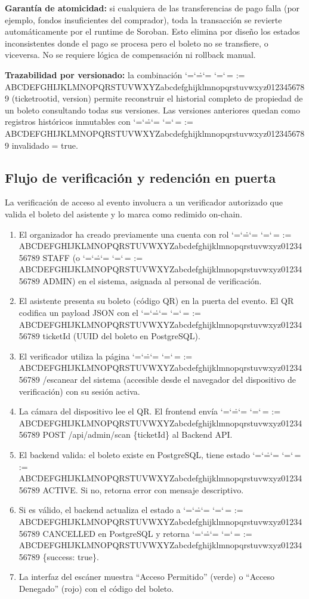 \documentclass[12pt,oneside]{article}
\makeatletter
\def\ttbreak@uscore{\char95\penalty0\hskip0pt\relax}%
\def\ttbreak@actcat#1{\catcode`#1=\active}%
\def\ttbreak@chars{%
  \catcode`\/=\active \catcode`\.=\active \catcode`\:=\active
  \catcode`\-=\active \catcode`\,=\active
  \@tfor\ttbreak@c:=%
ABCDEFGHIJKLMNOPQRSTUVWXYZabcdefghijklmnopqrstuvwxyz0123456789\do{%
    \expandafter\ttbreak@actcat\ttbreak@c}%
  \let\_\ttbreak@uscore}%
\DeclareRobustCommand{\texttt}{\begingroup\ttfamily\ttbreak@chars\ttbreak@grab}
\def\ttbreak@grab#1{#1\endgroup}
\makeatother
\begin{document}
\textbf{Garantía de atomicidad:} si cualquiera de las transferencias de pago falla (por ejemplo, fondos insuficientes del comprador), toda la transacción se revierte automáticamente por el runtime de Soroban. Esto elimina por diseño los estados inconsistentes donde el pago se procesa pero el boleto no se transfiere, o viceversa. No se requiere lógica de compensación ni rollback manual.

\textbf{Trazabilidad por versionado:} la combinación \texttt{(ticket\_root\_id, version)} permite reconstruir el historial completo de propiedad de un boleto consultando todas sus versiones. Las versiones anteriores quedan como registros históricos inmutables con \texttt{invalidado = true}.

\subsection{Flujo de verificación y redención en puerta}

La verificación de acceso al evento involucra a un verificador autorizado que valida el boleto del asistente y lo marca como redimido on-chain.

\begin{enumerate}
  \item El organizador ha creado previamente una cuenta con rol \texttt{STAFF} (o \texttt{ADMIN}) en el sistema, asignada al personal de verificación.
  \item El asistente presenta su boleto (código QR) en la puerta del evento. El QR codifica un payload JSON con el \texttt{ticketId} (UUID del boleto en PostgreSQL).
  \item El verificador utiliza la página \texttt{/escanear} del sistema (accesible desde el navegador del dispositivo de verificación) con su sesión activa.
  \item La cámara del dispositivo lee el QR. El frontend envía \texttt{POST /api/admin/scan \{ticketId\}} al Backend API.
  \item El backend valida: el boleto existe en PostgreSQL, tiene estado \texttt{ACTIVE}. Si no, retorna error con mensaje descriptivo.
  \item Si es válido, el backend actualiza el estado a \texttt{CANCELLED} en PostgreSQL y retorna \texttt{\{success: true\}}.
  \item La interfaz del escáner muestra ``Acceso Permitido'' (verde) o ``Acceso Denegado'' (rojo) con el código del boleto.
\end{enumerate}
\end{document}
